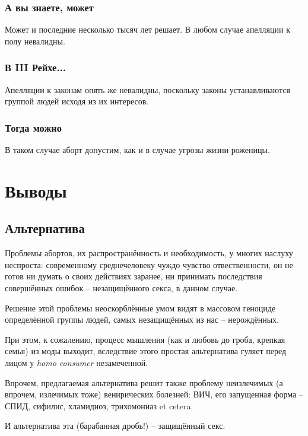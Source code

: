 \documentclass[a4paper,12pt]{report}
\begin{document}
    \section{А вы знаете, может}
        Может и последние несколько тысяч лет решает. В любом случае апелляции к полу невалидны.
    \section{В III Рейхе...}\label{laws}
        Апелляции к законам опять же невалидны, поскольку законы устанавливаются группой 
        людей исходя из их интересов.
	\section{Тогда можно}
        В таком случае аборт допустим, как и в случае угрозы жизни роженицы.


\part{Выводы}
\chapter{Альтернатива}
Проблемы абортов, их распространённость и необходимость, у многих наслуху неспроста: 
современному среднечеловеку чуждо чувство отвественности, он не готов ни думать о 
своих действиях заранее, ни принимать последствия совершённых ошибок -- незащищённого 
секса, в данном случае.

Решение этой проблемы неоскорблённые умом видят в массовом геноциде определённой 
группы людей, самых незащищённых из нас --  нерождённых. 

При этом, к сожалению, процесс мышления (как и любовь до гроба, крепкая семья) из 
моды выходит, вследствие этого простая альтернатива гуляет перед лицом у \textit{homo consumer} 
незамеченной. 

Впрочем, предлагаемая альтернатива решит также проблему неизлечимых (а впрочем, 
излечимых тоже) венирических болезней: ВИЧ, его запущенная форма -- СПИД, 
сифилис, хламидиоз, трихомониаз et cetera.

И альтернатива эта (барабанная дробь!) -- защищённый секс.
\end{document}
